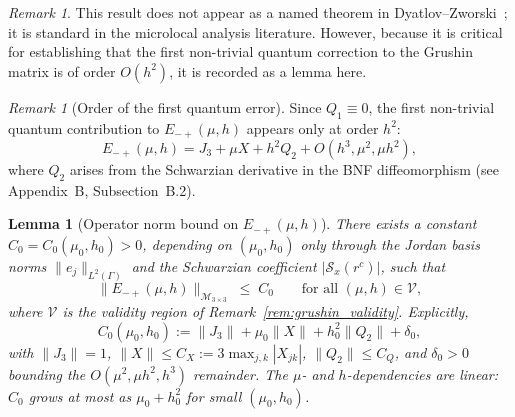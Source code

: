 \documentclass[12pt,a4paper]{amsart}
\newtheorem{lemma}[theorem]{Lemma}
\theoremstyle{remark}
\newtheorem{remark}[theorem]{Remark}
\begin{document}
\begin{remark}
This result does not appear as a named theorem in Dyatlov--Zworski~\cite{DZ19}; it is
standard in the microlocal analysis literature. However, because it is critical for
establishing that the first non-trivial quantum correction to the Grushin matrix is of order $O(h^2)$,
it is recorded as a lemma here.
\end{remark}

\begin{remark}[Order of the first quantum error]
Since $Q_1 \equiv 0$, the first non-trivial quantum contribution to $E_{-+}(\mu,h)$ appears
only at order $h^2$:
\[
  E_{-+}(\mu,h) = J_3 + \mu X + h^2 Q_2 + O(h^3, \mu^2, \mu h^2),
\]
where $Q_2$ arises from the Schwarzian derivative in the BNF diffeomorphism
(see Appendix~B, Subsection~B.2).
\end{remark}

\begin{lemma}[Operator norm bound on $E_{-+}(\mu,h)$]
\label{lem:E_bound}
There exists a constant $C_0 = C_0(\mu_0, h_0) > 0$, depending on $(\mu_0, h_0)$ only through
the Jordan basis norms $\|e_j\|_{L^2(\Gamma)}$ and the Schwarzian coefficient
$|\mathcal{S}_x(r^c)|$, such that
\[
  \|E_{-+}(\mu,h)\|_{\mathcal{M}_{3\times 3}} \;\leq\; C_0
  \qquad \text{for all } (\mu,h) \in \mathcal{V},
\]
where $\mathcal{V}$ is the validity region of Remark~\ref{rem:grushin_validity}.
Explicitly,
\[
  C_0(\mu_0, h_0) := \|J_3\| + \mu_0\|X\| + h_0^2\|Q_2\| + \delta_0,
\]
{ with $\|J_3\| = 1$, $\|X\| \leq C_X := 3\max_{j,k}|X_{jk}|$,
$\|Q_2\| \leq C_Q$, and $\delta_0 > 0$ bounding the
$O(\mu^2, \mu h^2, h^3)$ remainder.
The $\mu$- and $h$-dependencies are \emph{linear}: $C_0$ grows
at most as $\mu_0 + h_0^2$ for small $(\mu_0, h_0)$.}
\end{lemma}
\end{document}
